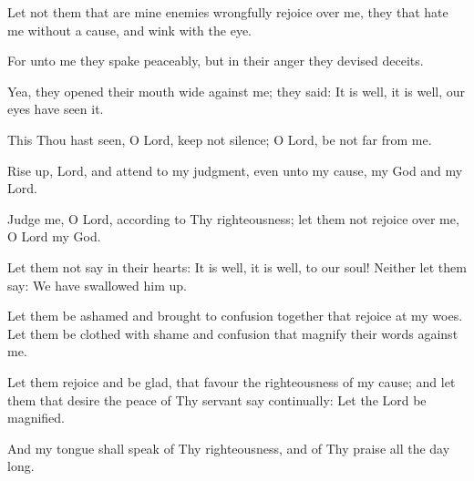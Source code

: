 Let not them that are mine enemies wrongfully rejoice over me, they that hate me without a cause, and wink with the eye.

For unto me they spake peaceably, but in their anger they devised deceits.

Yea, they opened their mouth wide against me; they said: It is well, it is well, our eyes have seen it.

This Thou hast seen, O Lord, keep not silence; O Lord, be not far from me.

Rise up, Lord, and attend to my judgment, even unto my cause, my God and my Lord.

Judge me, O Lord, according to Thy righteousness; let them not rejoice over me, O Lord my God.

Let them not say in their hearts: It is well, it is well, to our soul! Neither let them say: We have swallowed him up.

Let them be ashamed and brought to confusion together that rejoice at my woes. Let them be clothed with shame and confusion that magnify their words against me.

Let them rejoice and be glad, that favour the righteousness of my cause; and let them that desire the peace of Thy servant say continually: Let the Lord be magnified.

And my tongue shall speak of Thy righteousness, and of Thy praise all the day long.

